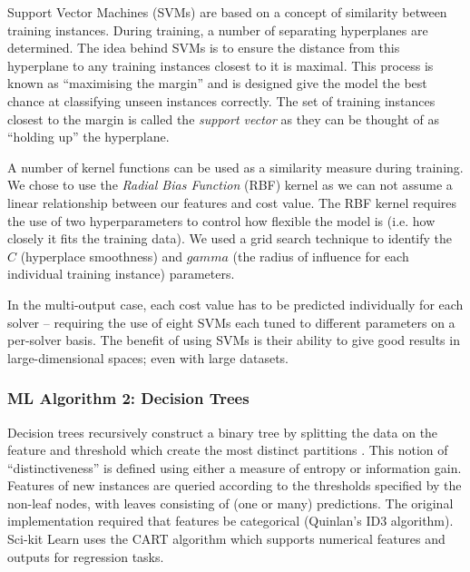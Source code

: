 Support Vector Machines (SVMs) \cite{svm} are based on a concept of similarity between training instances. 
During training, a number of separating hyperplanes are determined.
The idea behind SVMs is to ensure the distance from this hyperplane to any training instances closest to it is maximal.
This process is known as ``maximising the margin'' and is designed give the model the best chance at classifying unseen instances correctly. 
The set of training instances closest to the margin is called the \textit{support vector} as they can be thought of as ``holding up'' the hyperplane.

A number of kernel functions can be used as a similarity measure during training.
We chose to use the \textit{Radial Bias Function} (RBF) kernel as we can not assume a linear relationship between our features and cost value. 
The RBF kernel requires the use of two hyperparameters to control how flexible the model is (i.e. how closely it fits the training data). 
We used a grid search technique \cite{hsu2003practical} to identify the $C$ (hyperplace smoothness) and $gamma$ (the radius of influence for each individual training instance) parameters.

In the multi-output case, each cost value has to be predicted individually for each solver -- requiring the use of eight SVMs each tuned to different parameters on a per-solver basis.
The benefit of using SVMs is their ability to give good results in large-dimensional spaces; even with large datasets. 

\subsubsection{ML Algorithm 2: Decision Trees}

Decision trees recursively construct a binary tree by  splitting the data on the feature and threshold which create the most distinct partitions \cite{DecisionTrees}.
This notion of ``distinctiveness'' is defined using either a measure of entropy or information gain.
Features of new instances are queried according to the thresholds specified by the non-leaf nodes, with leaves consisting of (one or many) predictions. 
The original implementation required that features be categorical (Quinlan's ID3 algorithm). 
Sci-kit Learn uses the CART \cite{cart} algorithm which supports numerical features and outputs for regression tasks.  

